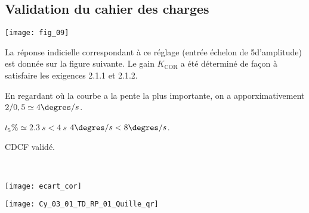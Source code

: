 \subsection*{Validation du cahier des charges} 

\ifprof
\else
\begin{marginfigure}
\texttt{[image: fig\_09]}
\end{marginfigure}
\fi



\ifprof
\else
La réponse indicielle correspondant à ce réglage (entrée échelon de 5\degres d’amplitude) est donnée sur la figure suivante. Le gain $K_{\text{COR}}$ a été déterminé de façon à satisfaire les exigences  2.1.1 et 2.1.2.
\fi



\ifprof
\begin{corrige}
En regardant où la courbe a la pente la plus importante, on a apporximativement $2/0,5\simeq 4 \degres/s$.

$t_5\%\simeq \SI{2,3}{s}<\SI{4}{s}$ $ 4 \degres/s< 8 \degres/s$.

CDCF validé. 
\end{corrige}
\else
\fi

\ifprof
\begin{corrige}~\\
\begin{center}
\texttt{[image: ecart\_cor]}
\end{center}
\end{corrige}
\else
\fi

\ifprof
\else
\begin{marginfigure}
\centering
\texttt{[image: Cy\_03\_01\_TD\_RP\_01\_Quille\_qr]}
\end{marginfigure}
\fi


